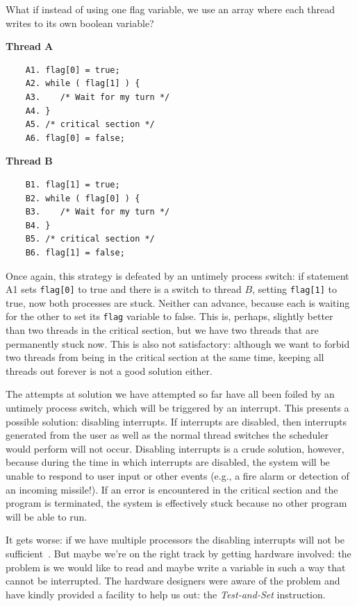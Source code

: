 \documentclass[a4paper]{report}
\begin{document}
What if instead of using one flag variable, we use an array where each thread writes to its own boolean variable?

\begin{multicols}{2}
	\textbf{Thread A}\vspace{-2em}
	\begin{verbatim}
	A1. flag[0] = true;
	A2. while ( flag[1] ) {
	A3.    /* Wait for my turn */
	A4. }
	A5. /* critical section */
	A6. flag[0] = false;
	\end{verbatim}
	\columnbreak
	\textbf{Thread B}\vspace{-2em}
	\begin{verbatim}
	B1. flag[1] = true;
	B2. while ( flag[0] ) {
	B3.    /* Wait for my turn */
	B4. }
	B5. /* critical section */
	B6. flag[1] = false;
	\end{verbatim}
\end{multicols}

Once again, this strategy is defeated by an untimely process switch: if statement A1 sets \texttt{flag[0]} to true and there is a switch to thread $B$, setting \texttt{flag[1]} to true, now both processes are stuck. Neither can advance, because each is waiting for the other to set its \texttt{flag} variable to false. This is, perhaps, slightly better than two threads in the critical section, but we have two threads that are permanently stuck now. This is also not satisfactory: although we want to forbid two threads from being in the critical section at the same time, keeping all threads out forever is not a good solution either.

The attempts at solution we have attempted so far have all been foiled by an untimely process switch, which will be triggered by an interrupt. This presents a possible solution: disabling interrupts. If interrupts are disabled, then interrupts generated from the user as well as the normal thread switches the scheduler would perform will not occur. Disabling interrupts is a crude solution, however, because during the time in which interrupts are disabled, the system will be unable to respond to user input or other events (e.g., a fire alarm or detection of an incoming missile!). If an error is encountered in the critical section and the program is terminated, the system is effectively stuck because no other program will be able to run.

It gets worse: if we have multiple processors the disabling interrupts will not be sufficient~\cite{osi}. But maybe we're on the right track by getting hardware involved: the problem is we would like to read and maybe write a variable in such a way that cannot be interrupted. The hardware designers were aware of the problem and have kindly provided a facility to help us out: the \textit{Test-and-Set} instruction.
\end{document}
